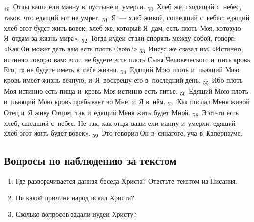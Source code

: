 \documentclass[a4paper,12pt]{article}
\begin{document}
\textsubscript{49}~Отцы ваши ели манну в~пустыне и~умерли.
\textsubscript{50}~Хлеб же, сходящий с~небес, таков, что едящий его не умрет.
\textsubscript{51}~Я~— хлеб живой, сошедший с~небес; едящий хлеб этот будет жить вовек; хлеб же, который Я~дам, есть плоть Моя, которую Я~отдам за жизнь мира».
\textsubscript{52}~Тогда иудеи стали спорить между собой, говоря: «Как Он может дать нам есть плоть Свою?»
\textsubscript{53}~Иисус же сказал им: «Истинно, истинно говорю вам: если не будете есть плоть Сына Человеческого и~пить кровь Его, то не будете иметь в~себе жизни.
\textsubscript{54}~Едящий Мою плоть и~пьющий Мою кровь имеет жизнь вечную, и~Я~воскрешу его в~последний день.
\textsubscript{55}~Ибо плоть Моя истинно есть пища и~кровь Моя истинно есть питье.
\textsubscript{56}~Едящий Мою плоть и~пьющий Мою кровь пребывает во Мне, и~Я в~нём.
\textsubscript{57}~Как послал Меня живой Отец и~Я живу Отцом, так и~едящий Меня жить будет Мной.
\textsubscript{58}~Этот-то есть хлеб, сшедший с~небес. Не так, как отцы ваши ели манну и~умерли; едящий хлеб этот жить будет вовек».
\textsubscript{59}~Это говорил Он в~синагоге, уча в~Капернауме. 

\subsection*{Вопросы по наблюдению за текстом}
\begin{enumerate}
    \item Где разворачивается данная беседа Христа? Ответьте текстом из Писания. 
    
    \myline
    
    \myline
    \item По какой причине народ искал Христа? 
    
    \myline
    
    \myline
    \item Сколько вопросов задали иудеи Христу? 
    
    \myline
    
    \myline
\end{enumerate}
\end{document}

